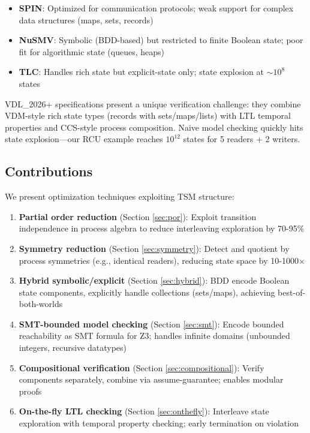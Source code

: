 \documentclass[conference]{IEEEtran}
\begin{document}
\begin{itemize}
\item \textbf{SPIN}: Optimized for communication protocols; weak support for complex data structures (maps, sets, records)
\item \textbf{NuSMV}: Symbolic (BDD-based) but restricted to finite Boolean state; poor fit for algorithmic state (queues, heaps)
\item \textbf{TLC}: Handles rich state but explicit-state only; state explosion at $\sim 10^8$ states
\end{itemize}

VDL\_2026+ specifications present a unique verification challenge: they combine VDM-style rich state types (records with sets/maps/lists) with LTL temporal properties and CCS-style process composition. Naive model checking quickly hits state explosion---our RCU example reaches $10^{12}$ states for 5 readers + 2 writers.

\subsection{Contributions}

We present optimization techniques exploiting TSM structure:

\begin{enumerate}
\item \textbf{Partial order reduction} (Section \ref{sec:por}): Exploit transition independence in process algebra to reduce interleaving exploration by 70-95\%

\item \textbf{Symmetry reduction} (Section \ref{sec:symmetry}): Detect and quotient by process symmetries (e.g., identical readers), reducing state space by 10-1000×

\item \textbf{Hybrid symbolic/explicit} (Section \ref{sec:hybrid}): BDD encode Boolean state components, explicitly handle collections (sets/maps), achieving best-of-both-worlds

\item \textbf{SMT-bounded model checking} (Section \ref{sec:smt}): Encode bounded reachability as SMT formula for Z3; handles infinite domains (unbounded integers, recursive datatypes)

\item \textbf{Compositional verification} (Section \ref{sec:compositional}): Verify components separately, combine via assume-guarantee; enables modular proofs

\item \textbf{On-the-fly LTL checking} (Section \ref{sec:onthefly}): Interleave state exploration with temporal property checking; early termination on violation
\end{enumerate}
\end{document}
